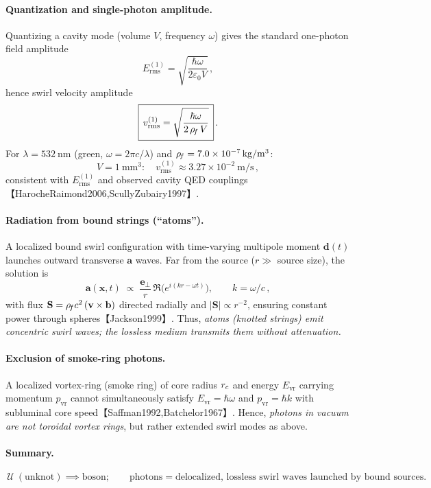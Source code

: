 \documentclass[11pt]{article}
\begin{document}
\paragraph{Quantization and single-photon amplitude.}
    Quantizing a cavity mode (volume $V$, frequency $\omega$) gives the standard one-photon field amplitude
    \[
        E_{\text{rms}}^{(1)} = \sqrt{\frac{\hbar\omega}{2\varepsilon_0 V}}\,,
    \]
    hence swirl velocity amplitude
    \[
        \boxed{\,v_{\text{rms}}^{(1)} = \sqrt{\frac{\hbar\omega}{2\,\rho_{\!f}\,V}}\,}\,.
    \]
    For $\lambda = 532~\mathrm{nm}$ (green, $\omega=2\pi c/\lambda$) and $\rho_{\!f}=7.0\times10^{-7}\,\mathrm{kg/m^3}$:
    \[
        V=1~\mathrm{mm}^3: \quad v_{\text{rms}}^{(1)} \approx 3.27\times10^{-2}\ \mathrm{m/s}\,,
    \]
    consistent with $E_{\text{rms}}^{(1)}$ and observed cavity QED couplings【HarocheRaimond2006,ScullyZubairy1997】.

\paragraph{Radiation from bound strings (``atoms'').}
    A localized bound swirl configuration with time-varying multipole moment $\mathbf{d}(t)$ launches outward transverse $\mathbf{a}$ waves. Far from the source ($r \gg$ source size), the solution is
    \[
        \mathbf{a}(\mathbf{x},t) \;\propto\; \frac{\mathbf{e}_\perp}{r}\,\Re\!\big(e^{i(kr-\omega t)}\big), \qquad k=\omega/c\,,
    \]
    with flux $\mathbf{S}=\rho_{\!f} c^2\,(\mathbf{v}\times\mathbf{b})$ directed radially and $|\mathbf{S}|\propto r^{-2}$, ensuring constant power through spheres【Jackson1999】. Thus, \emph{atoms (knotted strings) emit concentric swirl waves; the lossless medium transmits them without attenuation.}

\paragraph{Exclusion of smoke-ring photons.}
    A localized vortex-ring (smoke ring) of core radius $r_c$ and energy $E_{\text{vr}}$ carrying momentum $p_{\text{vr}}$ cannot simultaneously satisfy $E_{\text{vr}}=\hbar\omega$ and $p_{\text{vr}}=\hbar k$ with subluminal core speed【Saffman1992,Batchelor1967】. Hence, \emph{photons in vacuum are not toroidal vortex rings}, but rather extended swirl modes as above.

\paragraph{Summary.}
    \[
        \boxed{\,\mathcal{U} \ (\text{unknot}) \implies \text{boson}; \qquad
        \text{photons} = \text{delocalized, lossless swirl waves launched by bound sources.}\,}
    \]
\end{document}
